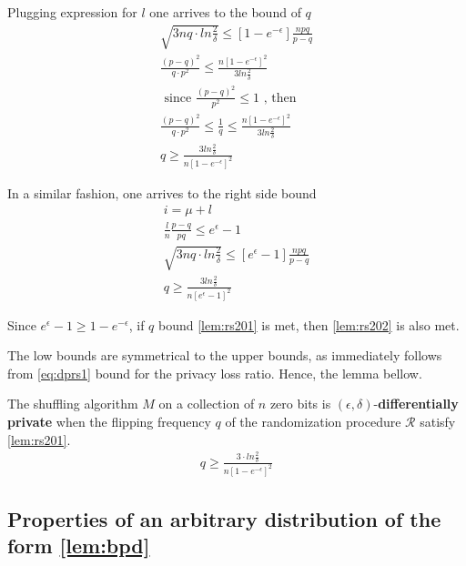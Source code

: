 \documentclass[11pt]{article}
\newcommand{\cR}{\mathcal{R}}
\begin{document}
Plugging expression for $l$ one arrives to the bound of $q$
\begin{align}
\sqrt{3nq \cdot ln\frac{2}{\delta}} \le \left [ 1 - e^{-\epsilon}\right ] \frac { npq}{p - q} \\
 \frac {(p - q)^2} {q \cdot p^2} \le   \frac { n \left [ 1 - e^{-\epsilon}\right ]^2 } { 3  ln\frac{2}{\delta}}  \\
 \text{ since }  \frac {(p - q)^2} { p^2} \le 1 \text{ , then }  \\
  \frac {(p - q)^2} {q \cdot p^2} \le \frac{1}{q}  \le   \frac { n \left [ 1 - e^{-\epsilon}\right ]^2 } { 3  ln\frac{2}{\delta}}  \\
  q \ge  \frac { 3  ln\frac{2}{\delta}} { n \left [ 1 - e^{-\epsilon}\right ]^2 } \label{lem:rs201}
\end{align}

In a similar fashion, one arrives to the right side bound
\begin{align}
i = \mu + l \\
\frac{l}{n} \frac{p-q}{pq}  \le e^\epsilon - 1 \\
\sqrt{3nq \cdot ln\frac{2}{\delta}} \le \left [ e^\epsilon - 1  \right ] \frac { npq}{p - q} \\
  q \ge  \frac { 3  ln\frac{2}{\delta}} { n \left [ e^{\epsilon} - 1\right ]^2 }  \label{lem:rs202}
\end{align}

Since $e^{\epsilon} - 1 \ge 1 - e^{-\epsilon}$, if $q$ bound  \eqref{lem:rs201} is met, then \eqref{lem:rs202} is also met.

The low bounds are symmetrical to the upper bounds, as immediately follows from \ref{eq:dprs1} bound for the privacy loss ratio.  Hence, the lemma bellow.

 \begin{lem} \label{lem:rs203}
The shuffling algorithm $M$ on a collection of $n$ zero bits is $(\epsilon,\delta)$-\textbf{differentially private} when the flipping frequency $q$ of the randomization procedure $\cR$ satisfy \eqref{lem:rs201}.
 \begin{align*}
  q \ge  \frac { 3 \cdot ln\frac{2}{\delta}} { n \left [ 1 - e^{-\epsilon}\right ]^2 }
  \end{align*}
\end{lem}

\subsection{Properties of an arbitrary distribution of the form \ref{lem:bpd}}
\end{document}

